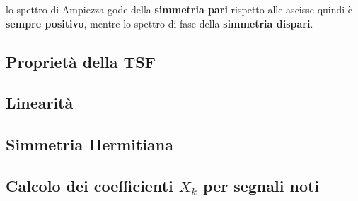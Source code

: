             lo spettro di Ampiezza gode della \textbf{simmetria pari} rispetto alle ascisse quindi è \textbf{sempre positivo}, mentre lo spettro di fase della \textbf{simmetria dispari}.
        \subsection{Proprietà della TSF}
            \subsection{Linearità}
            \subsection{Simmetria Hermitiana}
        
        \subsection{Calcolo dei coefficienti $X_k$ per segnali noti}

